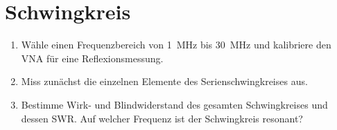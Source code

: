 \documentclass[a4paper,11pt,parskip=half,headings=small,DIV=11,notitlepage,abstract=on]{scrartcl}
\begin{document}
\section{Schwingkreis}
\begin{enumerate}
    \item Wähle einen Frequenzbereich von 1~MHz bis 30~MHz und kalibriere den VNA für eine Reflexionsmessung.
    \item Miss zunächst die einzelnen Elemente des Serienschwingkreises aus.
    \item Bestimme Wirk- und Blindwiderstand des gesamten Schwingkreises und dessen SWR. Auf welcher Frequenz ist der Schwingkreis resonant?
\end{enumerate}
\end{document}
